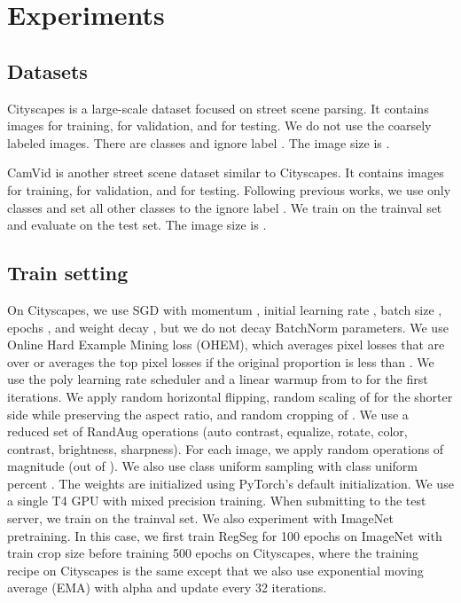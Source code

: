 \documentclass[10pt,twocolumn,letterpaper]{article}
\begin{document}
\section{Experiments}

\subsection{Datasets}
Cityscapes\cite{cityscapes} is a large-scale dataset focused on street scene parsing. It contains  images for training,  for validation, and  for testing. We do not use the  coarsely labeled images. There are  classes and ignore label . The image size is .

CamVid\cite{camvid} is another street scene dataset similar to Cityscapes. It contains  images for training,  for validation, and  for testing. Following previous works\cite{dfanet,bisenetv1,swiftnet}, we use only  classes and set all other classes to the ignore label . We train on the trainval set and evaluate on the test set. The image size is .




\subsection{Train setting}
\label{sec:trainingSetting}
On Cityscapes, we use SGD with momentum , initial learning rate , batch size , epochs , and weight decay , but we do not decay BatchNorm parameters. We use Online Hard Example Mining loss\cite{ohem} (OHEM), which averages pixel losses that are over  or averages the top  pixel losses if the original proportion is less than . We use the poly learning rate scheduler and a linear warmup\cite{warmup} from  to  for the first  iterations. We apply random horizontal flipping, random scaling of  for the shorter side while preserving the aspect ratio, and random cropping of . We use a reduced set of RandAug\cite{cubuk2020randaugment} operations (auto contrast, equalize, rotate, color, contrast, brightness, sharpness). For each image, we apply  random operations of magnitude  (out of ). We also use class uniform sampling\cite{classUniformSampling} with class uniform percent . The weights are initialized using PyTorch's\cite{pytorch} default initialization. We use a single T4 GPU with mixed precision training. When submitting to the test server, we train on the trainval set. We also experiment with ImageNet\cite{deng2009imagenet} pretraining. In this case, we first train RegSeg for 100 epochs on ImageNet with train crop size  before training 500 epochs on Cityscapes, where the training recipe on Cityscapes is the same except that we also use exponential moving average (EMA) with alpha  and update every 32 iterations.
\end{document}
